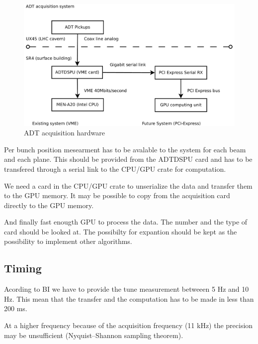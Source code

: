    \begin{figure}[H]
	\caption{ADT acquisition hardware}
	\centering
	\includegraphics[scale=0.3]{acquisition.pdf}
	\end{figure}

   Per bunch position mesearment has to be avalable to the system for each beam and each plane. This should be provided from the ADTDSPU card and has to be transfered through a serial link to the CPU/GPU crate for computation.

   We need a card in the CPU/GPU crate to unserialize the data and transfer them to the GPU memory. It may be possible to copy from the acquisition card directly to the GPU memory.

   And finally fast enougth GPU to process the data. The number and the type of card should be looked at. The possibilty for expantion should be kept as the possibility to implement other algorithms.
   
   \subsection{Timing}

   Acording to \gls{BI} we have to provide the tune measurement betweeen 5 Hz and 10 Hz. This mean that the transfer and the computation has to be made in less than 200 ms.

   At a higher frequency because of the acquisition frequency (11 kHz) the precision may be unsufficient (Nyquist–Shannon sampling theorem).
